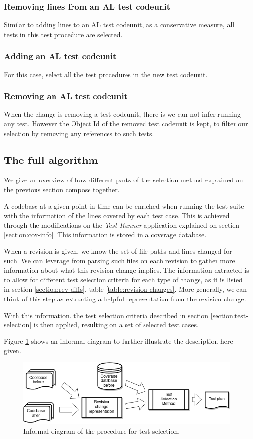 \documentclass{article}
\begin{document}
\subsubsection{Removing lines from an AL test codeunit}
Similar to adding lines to an AL test codeunit, as a conservative measure, all tests in this test procedure are selected.
\subsubsection{Adding an AL test codeunit}
For this case, select all the test procedures in the new test codeunit.
\subsubsection{Removing an AL test codeunit}
When the change is removing a test codeunit, there is we can not infer running any test. However the Object Id of the removed test codeunit is kept, to filter our selection by removing any references to such tests.
\subsection{The full algorithm}
We give an overview of how different parts of the selection method explained on the previous section compose together.

A codebase at a given point in time can be enriched when running the test suite with the information of the lines covered by each test case. This is achieved through the modifications on the \emph{Test Runner} application explained on section \ref{section:cov-info}. This information is stored in a coverage database.

When a revision is given, we know the set of file paths and lines changed for such. We can leverage from parsing such files on each revision to gather more information about what this revision change implies. The information extracted is to allow for different test selection criteria for each type of change, as it is listed in section \ref{section:rev-diffs}, table \ref{table:revision-changes}. More generally, we can think of this step as extracting a helpful representation from the revision change.

With this information, the test selection criteria described in section \ref{section:test-selection} is then applied, resulting on a set of selected test cases.

Figure \ref{fig:testselection} shows an informal diagram to further illustrate the description here given.
\begin{figure}[H]
  \includegraphics[width=\textwidth]{images/testselection.png}
  \caption{Informal diagram of the procedure for test selection.}
  \label{fig:testselection}
\end{figure}
\end{document}
